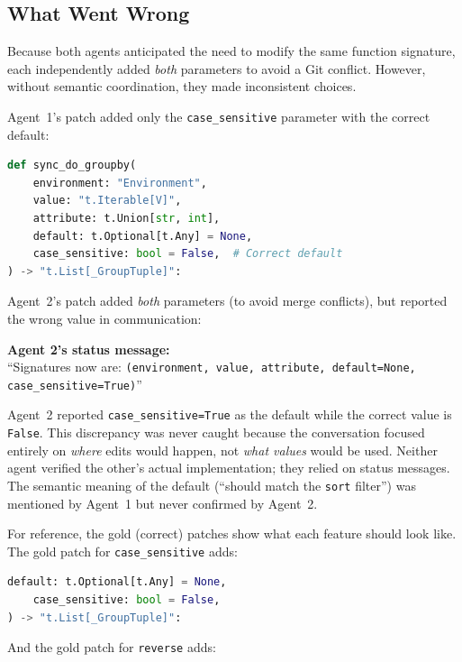 \subsection{What Went Wrong}

Because both agents anticipated the need to modify the same function signature, each independently added \emph{both} parameters to avoid a Git conflict. However, without semantic coordination, they made inconsistent choices.

Agent~1's patch added only the \texttt{case\_sensitive} parameter with the correct default:

\begin{lstlisting}[language=Python,basicstyle=\small\ttfamily]
def sync_do_groupby(
    environment: "Environment",
    value: "t.Iterable[V]",
    attribute: t.Union[str, int],
    default: t.Optional[t.Any] = None,
    case_sensitive: bool = False,  # Correct default
) -> "t.List[_GroupTuple]":
\end{lstlisting}

Agent~2's patch added \emph{both} parameters (to avoid merge conflicts), but reported the wrong value in communication:

\begin{tcolorbox}[evidencebox]
\small
\textbf{Agent 2's status message:}\\
``Signatures now are: \texttt{(environment, value, attribute, default=None, case\_sensitive=True)}''
\end{tcolorbox}

Agent~2 reported \texttt{case\_sensitive=True} as the default while the correct value is \texttt{False}. This discrepancy was never caught because the conversation focused entirely on \emph{where} edits would happen, not \emph{what values} would be used. Neither agent verified the other's actual implementation; they relied on status messages. The semantic meaning of the default (``should match the \texttt{sort} filter'') was mentioned by Agent~1 but never confirmed by Agent~2.

For reference, the gold (correct) patches show what each feature should look like. The gold patch for \texttt{case\_sensitive} adds:

\begin{lstlisting}[language=Python,basicstyle=\small\ttfamily]
    default: t.Optional[t.Any] = None,
    case_sensitive: bool = False,
) -> "t.List[_GroupTuple]":
\end{lstlisting}

And the gold patch for \texttt{reverse} adds:

